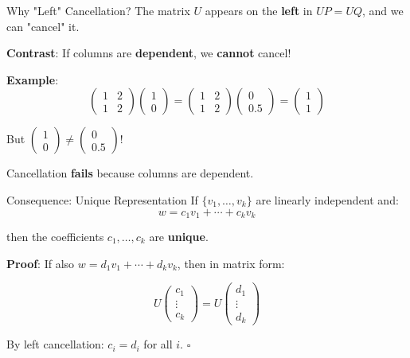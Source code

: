 \documentclass[10pt]{beamer}
\theoremstyle{definition}
\newcommand{\x}[1]{\alert{\textbf{#1}}}
\begin{document}
\begin{frame}{Why "Left" Cancellation?}
The matrix $U$ appears on the \x{left} in $UP = UQ$, and we can "cancel" it.

\vfill
\x{Contrast}: If columns are \x{dependent}, we \x{cannot} cancel!

\vfill
\textbf{Example}:
$$\begin{pmatrix} 1 & 2 \\ 1 & 2 \end{pmatrix}\begin{pmatrix} 1 \\ 0 \end{pmatrix} = \begin{pmatrix} 1 & 2 \\ 1 & 2 \end{pmatrix}\begin{pmatrix} 0 \\ 0.5 \end{pmatrix} = \begin{pmatrix} 1 \\ 1 \end{pmatrix}$$

But $\begin{pmatrix} 1 \\ 0 \end{pmatrix} \neq \begin{pmatrix} 0 \\ 0.5 \end{pmatrix}$!

Cancellation \x{fails} because columns are dependent.
\end{frame}

\begin{frame}{Consequence: Unique Representation}
If $\{v_1, \ldots, v_k\}$ are linearly independent and:
$$w = c_1v_1 + \cdots + c_kv_k$$

then the coefficients $c_1, \ldots, c_k$ are \x{unique}.

\vfill
\textbf{Proof}: If also $w = d_1v_1 + \cdots + d_kv_k$, then in matrix form:

$$U\begin{pmatrix} c_1 \\ \vdots \\ c_k \end{pmatrix} = U\begin{pmatrix} d_1 \\ \vdots \\ d_k \end{pmatrix}$$

By left cancellation: $c_i = d_i$ for all $i$. $\square$
\end{frame}
\end{document}
